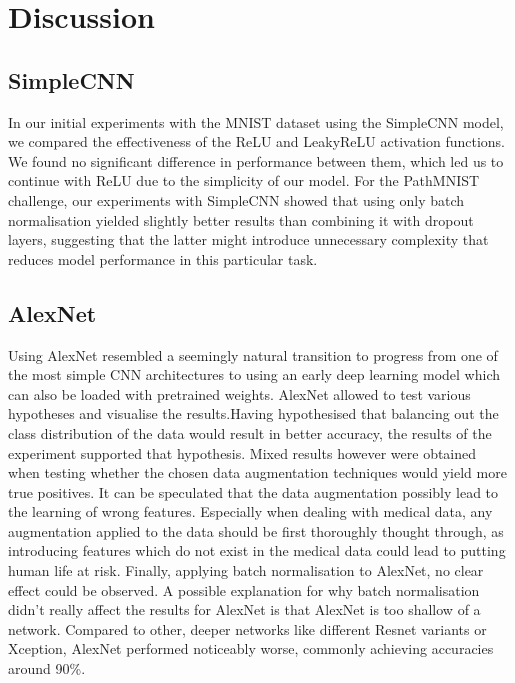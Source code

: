 \section{Discussion}\label{discussion}

\subsection{SimpleCNN}\label{SimpleCNNDiscussion}
In our initial experiments with the MNIST dataset using the SimpleCNN model, we compared the effectiveness of the ReLU and LeakyReLU activation functions. We found no significant difference in performance between them, which led us to continue with ReLU due to the simplicity of our model. For the PathMNIST challenge, our experiments with SimpleCNN showed that using only batch normalisation yielded slightly better results than combining it with dropout layers, suggesting that the latter might introduce unnecessary complexity that reduces model performance in this particular task.

\subsection{AlexNet}\label{AlexNetDiscussion}
Using AlexNet resembled a seemingly natural transition to progress from one of the most simple CNN architectures to using an early deep learning model which can also be loaded with pretrained weights. AlexNet allowed to test various hypotheses and visualise the results.Having hypothesised that balancing out the class distribution of the data would result in better accuracy, the results of the experiment supported that hypothesis. Mixed results however were obtained when testing whether the chosen data augmentation techniques would yield more true positives. It can be speculated that the data augmentation possibly lead to the learning of wrong features. Especially when dealing with medical data, any augmentation applied to the data should be first thoroughly thought through, as introducing features which do not exist in the medical data could lead to putting human life at risk. Finally, applying batch normalisation to AlexNet, no clear effect could be observed. A possible explanation for why batch normalisation didn't really affect the results for AlexNet is that AlexNet is too shallow of a network. Compared to other, deeper networks like different Resnet variants or Xception, AlexNet performed noticeably worse, commonly achieving accuracies around 90\%.




